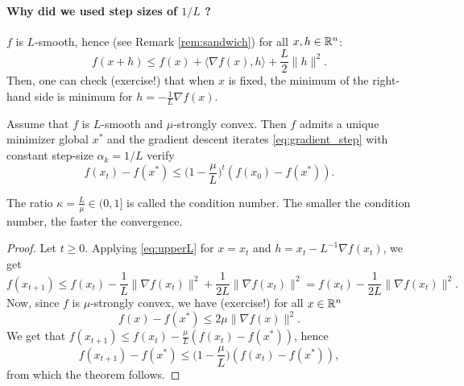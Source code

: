 \documentclass[11pt,nocut]{article}
\begin{document}
\paragraph{Why did we used step sizes of $1/L$ ?} $f$ is $L$-smooth, hence (see Remark \ref{rem:sandwich}) for all $x,h \in \mathbb{R}^n$:
\begin{equation}\label{eq:upperL}
f(x+h) \leq f(x) + \langle \nabla f(x) , h \rangle + \frac{L}{2} \|h\|^2.
\end{equation}
Then, one can check (exercise!) that when $x$ is fixed, the minimum of the right-hand side is minimum for $h = - \frac{1}{L} \nabla f(x)$.

\begin{theorem}\label{th:gradient2}
	Assume that $f$ is $L$-smooth and $\mu$-strongly convex. 
	Then $f$ admits a unique minimizer global $x^*$ and
	the gradient descent iterates \eqref{eq:gradient_step} with constant step-size $\alpha_k = 1/L$ verify
	$$
	f(x_t) - f(x^*) \leq \Big(1-\frac{\mu}{L}\Big)^t (f(x_0) - f(x^*)).
	$$
\end{theorem}
\begin{remark}
	The ratio $\kappa = \frac{L}{\mu} \in (0,1]$ is called the condition number. The smaller the condition number, the faster the convergence.
\end{remark}

\begin{proof}
	Let $t \geq 0$. Applying \eqref{eq:upperL} for $x=x_t$ and $h=x_t - L^{-1} \nabla f(x_t)$, we get
	$$
	f(x_{t+1}) 
	\leq f(x_t) - \frac{1}{L} \|\nabla f(x_t) \|^2 + \frac{1}{2L}\|\nabla f(x_t) \|^2
	= f(x_t) - \frac{1}{2L} \|\nabla f(x_t) \|^2.
	$$
	Now, since $f$ is $\mu$-strongly convex, we have (exercise!) for all $x \in \mathbb{R}^n$
	\begin{equation}\label{eq:boundG}
f(x) - f(x^*) \leq 2 \mu \|\nabla f(x)\|^2.
	\end{equation}
We get that $f(x_{t+1}) \leq f(x_t) - \frac{\mu}{L}(f(x_t) - f(x^*))$, hence
$$
f(x_{t+1}) - f(x^*) \leq \Big(1 - \frac{\mu}{L}\Big)(f(x_t) - f(x^*)),
$$
from which the theorem follows.
\end{proof}
\end{document}
